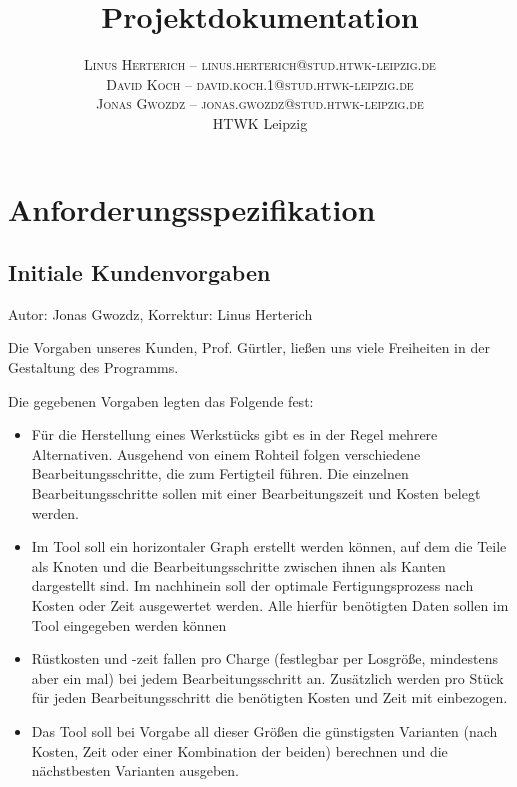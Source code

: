 \documentclass[twoside]{report}
\title{\vspace{-5mm}%
	\fontsize{24pt}{10pt}\selectfont
	\textbf{Projektdokumentation}
	}
\author{%
	\large
	\textsc{Linus Herterich -- linus.herterich@stud.htwk-leipzig.de} \\[2mm]
	\textsc{David Koch -- david.koch.1@stud.htwk-leipzig.de} \\[2mm]
	\textsc{Jonas Gwozdz -- jonas.gwozdz@stud.htwk-leipzig.de} \\[2mm]
	\normalsize	HTWK Leipzig 
	}
\date{}
\begin{document}

\maketitle
\thispagestyle{fancy}

\tableofcontents


\section{Anforderungsspezifikation}

\subsection{Initiale Kundenvorgaben}
{\small Autor: Jonas Gwozdz, Korrektur: Linus Herterich}

\vspace{\baselineskip}
\noindent Die Vorgaben unseres Kunden, Prof. Gürtler, ließen uns viele Freiheiten in der Gestaltung des Programms. \par

\noindent Die gegebenen Vorgaben legten das Folgende fest: \par
\begin{itemize}
  \item Für die Herstellung eines Werkstücks gibt es in der Regel mehrere Alternativen.
  Ausgehend von einem Rohteil folgen verschiedene   Bearbeitungsschritte, die zum Fertigteil führen. 
  Die einzelnen Bearbeitungsschritte sollen mit einer Bearbeitungszeit und Kosten belegt werden. \par

  \item Im Tool soll ein horizontaler Graph erstellt werden können, auf dem die Teile als Knoten und 
  die Bearbeitungsschritte zwischen ihnen als Kanten dargestellt sind. Im nachhinein soll der optimale 
  Fertigungsprozess nach Kosten oder Zeit ausgewertet werden. Alle hierfür benötigten Daten sollen im Tool eingegeben werden können\par

  \item Rüstkosten und -zeit fallen pro Charge (festlegbar per Losgröße, mindestens aber ein mal) bei jedem Bearbeitungsschritt an. 
  Zusätzlich werden pro Stück für jeden Bearbeitungsschritt die benötigten Kosten und Zeit mit einbezogen. \par

  \item Das Tool soll bei Vorgabe all dieser Größen die günstigsten Varianten (nach Kosten, Zeit oder einer Kombination der beiden) 
  berechnen und die nächstbesten Varianten ausgeben.
\end{itemize}
\end{document}
